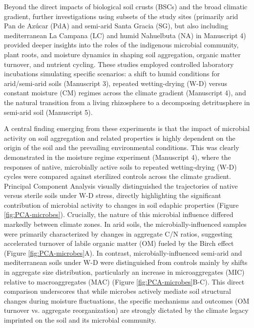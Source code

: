 Beyond the direct impacts of biological soil crusts (BSCs) and the broad climatic gradient, further investigations using subsets of the study sites (primarily arid Pan de Azúcar (PdA) and semi-arid Santa Gracia (SG), but also including mediterranean La Campana (LC) and humid Nahuelbuta (NA) in Manuscript 4) provided deeper insights into the roles of the indigenous microbial community, plant roots, and moisture dynamics in shaping soil aggregation, organic matter turnover, and nutrient cycling. These studies employed controlled laboratory incubations simulating specific scenarios: a shift to humid conditions for arid/semi-arid soils (Manuscript 3), repeated wetting-drying (W-D) versus constant moisture (CM) regimes across the climate gradient (Manuscript 4), and the natural transition from a living rhizosphere to a decomposing detritusphere in semi-arid soil (Manuscript 5).

A central finding emerging from these experiments is that the impact of microbial activity on soil aggregation and related properties is highly dependent on the origin of the soil and the prevailing environmental conditions. This was clearly demonstrated in the moisture regime experiment (Manuscript 4), where the responses of native, microbially active soils to repeated wetting-drying (W-D) cycles were compared against sterilized controls across the climate gradient. Principal Component Analysis visually distinguished the trajectories of native versus sterile soils under W-D stress, directly highlighting the significant contribution of microbial activity to changes in soil edaphic properties (Figure \ref{fig:PCA-microbes}). Crucially, the nature of this microbial influence differed markedly between climate zones. In arid soils, the microbially-influenced samples were primarily characterized by changes in aggregate C/N ratios, suggesting accelerated turnover of labile organic matter (OM) fueled by the Birch effect (Figure \ref{fig:PCA-microbes}A). In contrast, microbially-influenced semi-arid and mediterranean soils under W-D were distinguished from controls mainly by shifts in aggregate size distribution, particularly an increase in microaggregates (MIC) relative to macroaggregates (MAC) (Figure \ref{fig:PCA-microbes}B-C). This direct comparison underscores that while microbes actively mediate soil structural changes during moisture fluctuations, the specific mechanisms and outcomes (OM turnover vs. aggregate reorganization) are strongly dictated by the climate legacy imprinted on the soil and its microbial community.

